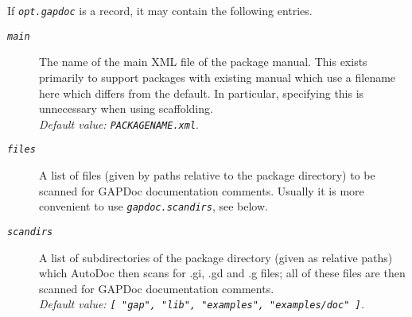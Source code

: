 \documentclass[a4paper,11pt]{report}
\begin{document}
{{{\begin{description}
\begin{description}
 If \mbox{\texttt{\mdseries\slshape opt.gapdoc}} is a record, it may contain the following entries. 
\begin{description}
\item[{\mbox{\texttt{\mdseries\slshape main}}}]  The name of the main XML file of the package manual. This exists primarily to
support packages with existing manual which use a filename here which differs
from the default. In particular, specifying this is unnecessary when using
scaffolding. \\
 \emph{Default value: \texttt{PACKAGENAME.xml}}. 
\item[{\mbox{\texttt{\mdseries\slshape files}}}]  A list of files (given by paths relative to the package directory) to be
scanned for \textsf{GAPDoc} documentation comments. Usually it is more convenient to use \mbox{\texttt{\mdseries\slshape gapdoc.scan{\textunderscore}dirs}}, see below. 
\item[{\mbox{\texttt{\mdseries\slshape scan{\textunderscore}dirs}}}]  A list of subdirectories of the package directory (given as relative paths)
which \textsf{AutoDoc} then scans for .gi, .gd and .g files; all of these files are then scanned for \textsf{GAPDoc} documentation comments. \\
 \emph{Default value: \texttt{[ "gap", "lib", "examples", "examples/doc" ]}.} 
\end{description}
 
\end{description}
 
\end{description}
 }

 }

 }

   
\end{document}

